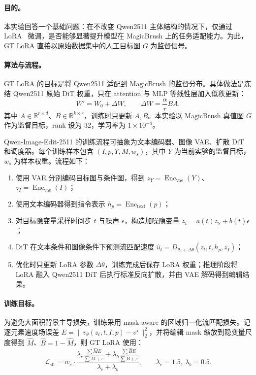 \documentclass[UTF8,11pt,a4paper,fontset=fandol]{ctexart}
\begin{document}
\paragraph{目的。}
本实验回答一个基础问题：在不改变 Qwen2511 主体结构的情况下，仅通过 LoRA~\cite{lora} 微调，是否能够显著提升模型在 MagicBrush 上的任务适配能力。为此，GT LoRA 直接以原始数据集中的人工目标图 $G$ 为监督信号。

\paragraph{算法与流程。}
GT LoRA 的目标是将 Qwen2511 适配到 MagicBrush 的监督分布。具体做法是冻结 Qwen2511 原始 DiT 权重，只在 attention 与 MLP 等线性层加入低秩更新：
\[
W'=W_0+\Delta W,\qquad
\Delta W=\frac{\alpha}{r}BA.
\]
其中 $A\in\mathbb{R}^{r\times d}$、$B\in\mathbb{R}^{k\times r}$，训练时只更新 $A,B$。本实验以 MagicBrush 真值图 $G$ 作为监督目标，rank 设为 32，学习率为 $1\times10^{-4}$。

Qwen-Image-Edit-2511 的训练流程可抽象为文本编码器、图像 VAE、扩散 DiT 和调度器。每个训练样本包含 $(I,p,Y,M,w_s)$，其中 $Y$ 为当前实验的监督目标，$w_s$ 为样本权重。流程如下：
\begin{enumerate}
  \item 使用 VAE 分别编码目标图与条件图，得到 $z_Y=\operatorname{Enc}_{\mathrm{vae}}(Y)$、$z_I=\operatorname{Enc}_{\mathrm{vae}}(I)$；
  \item 使用文本编码器得到指令表示 $h_p=\operatorname{Enc}_{\mathrm{text}}(p)$；
  \item 对目标隐变量采样时间步 $t$ 与噪声 $\epsilon$，构造加噪隐变量 $z_t=a(t)z_Y+b(t)\epsilon$；
  \item DiT 在文本条件和图像条件下预测流匹配速度 $\hat u_t=D_{\theta_0+\Delta\theta}(z_t,t,h_p,z_I)$；
  \item 优化时只更新 LoRA 参数 $\Delta\theta$，训练完成后保存 LoRA 权重；推理阶段将 LoRA 融入 Qwen2511 DiT 后执行标准反向扩散，并由 VAE 解码得到编辑结果。
\end{enumerate}

\paragraph{训练目标。}
为避免大面积背景主导损失，训练采用 mask-aware 的区域归一化流匹配损失。记逐元素速度场误差 $E=\|v_\theta(z_t,t,I,p)-v^\star\|_2^2$，并将编辑 mask 缩放到隐变量尺度得到 $\hat M$、$\hat B=1-\hat M$，则 GT LoRA 使用：
\[
\mathcal{L}_{\mathrm{sft}}
=
w_s\cdot
\frac{
\lambda_e\frac{\sum \hat M E}{\sum \hat M+\varepsilon}
+\lambda_b\frac{\sum \hat B E}{\sum \hat B+\varepsilon}
}
{\lambda_e+\lambda_b},
\qquad
\lambda_e=1.5,\ \lambda_b=0.5.
\]
\end{document}

